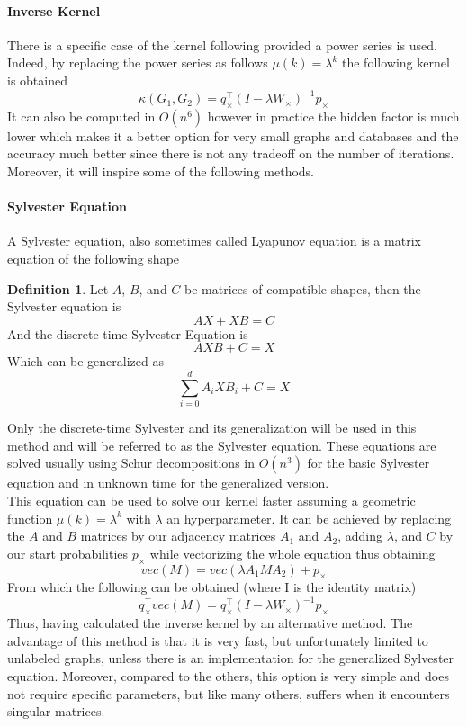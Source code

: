 \documentclass{article}
\theoremstyle{definition}
\newtheorem{definition}{Definition}
\begin{document}
\paragraph{Inverse Kernel}
There is a specific case of the kernel following provided a power series is used. Indeed, by replacing the power series as follows $\mu(k)=\lambda^k$ the following kernel is obtained 
\begin{equation}
	\kappa(G_1,G_2)=q_{\times}^{\top}(I-\lambda W_\times)^{-1}p_{\times}
\end{equation}
It can also be computed in $O(n^6)$ however in practice the hidden factor is much lower which makes it a better option for very small graphs and databases and the accuracy much better since there is not any tradeoff on the number of iterations. Moreover, it will inspire some of the following methods.
\paragraph{Sylvester Equation}
A Sylvester equation, also sometimes called Lyapunov equation is a matrix equation of the following shape 
\begin{definition}
	Let $A$, $B$, and $C$ be matrices of compatible shapes, then the Sylvester equation is
	\begin{equation}
	AX+XB=C
	\end{equation}
	And the discrete-time Sylvester Equation is 
	\begin{equation}
	AXB+C=X
	\end{equation}
	Which can be generalized as
	\begin{equation}
		\sum_{i=0}^{d}A_{i}XB_{i}+C=X
	\end{equation}
\end{definition}
Only the discrete-time Sylvester and its generalization will be used in this method and will be referred to as the Sylvester equation. These equations are solved usually using Schur decompositions in $O(n^3)$ for the basic Sylvester equation and in unknown time for the generalized version\cite{vishwanathan_graph_2010}.\\
This equation can be used to solve our kernel faster assuming a geometric function $\mu(k)=\lambda^k$ with $\lambda$ an hyperparameter. It can be achieved by replacing the $A$ and $B$ matrices by our adjacency matrices $A_1$ and $A_2$, adding $\lambda$, and $C$ by our start probabilities $p_\times$ while vectorizing the whole equation thus obtaining
\begin{equation}
	vec(M) = vec(\lambda A_{1}MA_{2}) + p_{\times}
\end{equation}
From which the following can be obtained (where I is the identity matrix)
\begin{equation}
	q_{\times}^{\top}vec(M)=q_{\times}^{\top}(I-\lambda W_{\times})^{-1}p_{\times}
\end{equation}
Thus, having calculated the inverse kernel by an alternative method. The advantage of this method is that it is very fast, but unfortunately limited to unlabeled graphs, unless there is an implementation for the generalized Sylvester equation. Moreover, compared to the others, this option is very simple and does not require specific parameters, but like many others, suffers when it encounters singular matrices. 
\end{document}
